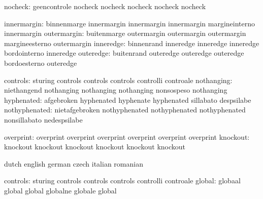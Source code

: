      nocheck: geencontrole  nocheck
              nocheck       nocheck
              nocheck       nocheck


              innermargin: binnenmarge               innermargin
                           innermargin               innermargin
                           margineinterno            innermargin
              outermargin: buitenmarge               outermargin
                           outermargin               outermargin
                           margineesterno            outermargin
                inneredge: binnenrand                inneredge
                           inneredge                 inneredge
                           bordointerno              inneredge
                outeredge: buitenrand                outeredge
                           outeredge                 outeredge
                           bordoesterno              outeredge

                 controls: sturing                   controls
                           controls                  controls
                           controlli                 controale
               nothanging: niethangend               nothanging
                           nothanging                nothanging
                           nonsospeso                nothanging
               hyphenated: afgebroken                hyphenated
                           hyphenate                 hyphenated
                           sillabato                 despsilabe
            nothyphenated: nietafgebroken            nothyphenated
                           nothyphenated             nothyphenated
                           nonsillabato              nedespsilabe

                overprint: overprint                 overprint
                           overprint                 overprint
                           overprint                 overprint %
                 knockout: knockout                  knockout
                           knockout                  knockout
                           knockout                  knockout %

\stopvariables

\startconstants            dutch                     english
                           german                    czech
                           italian                   romanian

                 controls: sturing                   controls
                           controls                  controls
                           controlli                 controale
                   global: globaal                   global
                           global                    globalne
                           globale                   global

